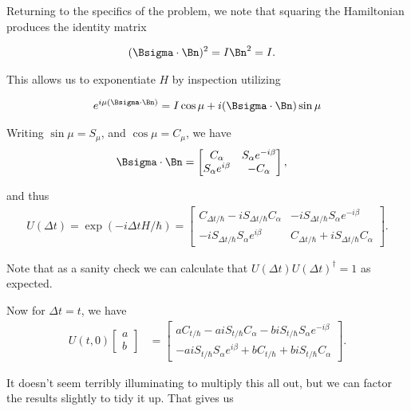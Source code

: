 Returning to the specifics of the problem, we note that squaring the Hamiltonian produces the identity matrix

\begin{align}\label{eqn:desaiCh5:615}
(\Bsigma \cdot \Bn)^2 &= I \Bn^2 = I.
\end{align}

This allows us to exponentiate $H$ by inspection utilizing

\begin{align}\label{eqn:desaiCh5:620}
e^{i \mu (\Bsigma \cdot \Bn) } = I \cos\mu + i (\Bsigma \cdot \Bn) \sin\mu
\end{align}

Writing $\sin\mu = S_\mu$, and $\cos\mu = C_\mu$, we have
\begin{align}\label{eqn:desaiCh5:625}
\Bsigma \cdot \Bn &=
\begin{bmatrix}
C_\alpha & S_\alpha e^{-i\beta} \\
S_\alpha e^{i\beta} & -C_\alpha
\end{bmatrix},
\end{align}

and thus
\begin{align}\label{eqn:desaiCh5:630}
U(\Delta t) = \exp( -i \Delta t H /\hbar )
=
\begin{bmatrix}
C_{\Delta t/\hbar} -i S_{\Delta t/\hbar} C_\alpha & -i S_{\Delta t/\hbar} S_\alpha e^{-i\beta} \\
-i S_{\Delta t/\hbar} S_\alpha e^{i\beta} & C_{\Delta t/\hbar} + i S_{\Delta t/\hbar} C_\alpha
\end{bmatrix}.
\end{align}

Note that as a sanity check we can calculate that $ U(\Delta t) U(\Delta t)^\dagger = 1$ as expected.

Now for $\Delta t = t$, we have 
\begin{align}\label{eqn:desaiCh5:640}
U(t,0) 
\begin{bmatrix}
a \\
b
\end{bmatrix}
&=
\begin{bmatrix}
a C_{t/\hbar} -a i S_{t/\hbar} C_\alpha  - b i S_{t/\hbar} S_\alpha e^{-i\beta} \\
-a i S_{t/\hbar} S_\alpha e^{i\beta} + b C_{t/\hbar} + b i S_{t/\hbar} C_\alpha
\end{bmatrix}.
\end{align}

It doesn't seem terribly illuminating to multiply this all out, but we can factor the results slightly to tidy it up.  That gives us

